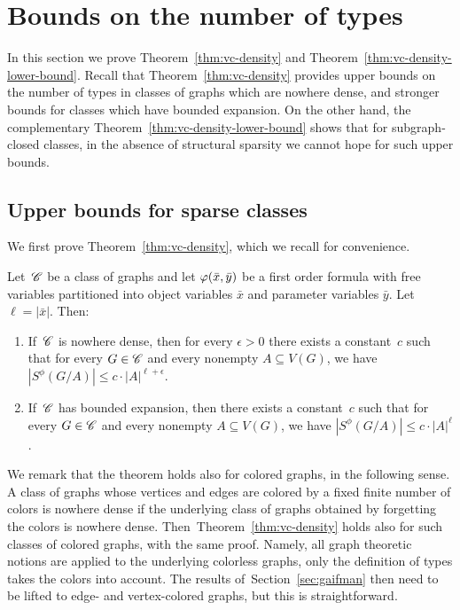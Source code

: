\section{Bounds on the number of types}\label{sec:types}

In this section we prove Theorem~\ref{thm:vc-density} and
Theorem~\ref{thm:vc-density-lower-bound}.  Recall that
Theorem~\ref{thm:vc-density} provides upper bounds on the number of
types in classes of graphs which are nowhere dense, and stronger
bounds for classes which have bounded expansion.  On the other hand,
the complementary Theorem~\ref{thm:vc-density-lower-bound} shows that
for subgraph-closed classes, in the absence of structural sparsity we
cannot hope for such upper bounds.

\subsection{Upper bounds for sparse classes}
We first prove Theorem~\ref{thm:vc-density}, which we recall for
convenience.


 \setcounter{aux}{\value{theorem}}
 \setcounter{theorem}{\value{vcupper}}
 \setcounter{auxsec}{\value{section}}
 \setcounter{section}{1}
 \begin{theorem}\label{thm:vc-density-recall}
   Let\, $\mathscr{C}$ be a class of graphs and let $\varphi(\bar{x},\bar{y})$ be
   a first order formula with free variables partitioned into object
   variables $\bar x$ and parameter variables $\bar y$. Let
   $\ell=|\bar x|$. Then:
 \begin{enumerate}
 \item If\, $\mathscr{C}$ is nowhere dense, then for every $\epsilon>0$
 there exists a constant~$c$ such that for every $G\in \mathscr{C}$ and every nonempty
 $A\subseteq V(G)$, we have $|S^\phi(G/A)|\leq c\cdot |A|^{\ell+\epsilon}.$
\item If\, $\mathscr{C}$ has bounded expansion, then there exists a
  constant~$c$ such that for every $G\in \mathscr{C}$ and every nonempty
  $A\subseteq V(G)$, we have $|S^\phi(G/A)|\leq c\cdot |A|^\ell$.
 \end{enumerate}
 \end{theorem}
 \setcounter{theorem}{\theaux} \setcounter{section}{\value{auxsec}} We
 remark that the theorem holds also for colored graphs, in the
 following sense.  A class of graphs whose vertices and edges are
 colored by a fixed finite number of colors is nowhere dense if the
 underlying class of graphs obtained by forgetting the colors is
 nowhere dense.  Then~Theorem~\ref{thm:vc-density} holds also for such
 classes of colored graphs, with the same proof. Namely, all graph
 theoretic notions are applied to the underlying colorless graphs,
 only the definition of types takes the colors into account.  The
 results of~Section~\ref{sec:gaifman} then need to be lifted to edge-
 and vertex-colored graphs, but this is straightforward.

